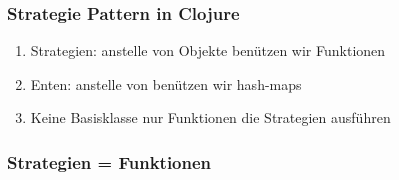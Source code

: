 \documentclass[compress, red]{beamer}
\begin{document}


\begin{frame}\frametitle{Strategie Pattern in Clojure}
  \begin{enumerate}
  \item Strategien: anstelle von Objekte benützen wir Funktionen
    \pause
  \item Enten: anstelle von benützen wir hash-maps 
    \pause
  \item Keine Basisklasse nur Funktionen die Strategien ausführen 
    \pause
  \end{enumerate}
\end{frame}

\begin{frame}\frametitle{Strategien = Funktionen}
  
\end{frame}























\end{document}
